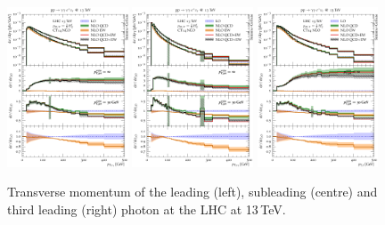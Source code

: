 \begin{figure}[t!]
  \centering
  \includegraphics[width=0.32\textwidth]{figs_aaw/pT_y1}
  \includegraphics[width=0.32\textwidth]{figs_aaw/pT_y2}
  \includegraphics[width=0.32\textwidth]{figs_aaw/pT_l1}
  \caption{
    Transverse momentum of the leading (left), subleading (centre) 
    and third leading (right) photon at the LHC at 13\,TeV.
    \label{fig:aaw:pt}
  }
\end{figure}

